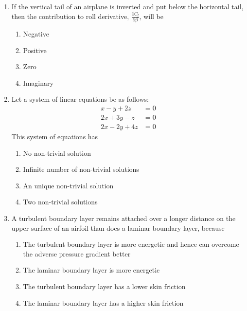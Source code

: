 \documentclass{article}
\begin{document}
\begin{enumerate}
    \item If the vertical tail of an airplane is inverted and put below the horizontal tail, then the contribution to roll derivative, $\frac{\partial C_l}{\partial \beta}$, will be
    \begin{multicols}{4}
    \begin{enumerate}
        \item Negative
        \item Positive
        \item Zero
        \item Imaginary
    \end{enumerate}
    \end{multicols}
        

    \item Let a system of linear equations be as follows:
    \[
    \begin{align}
        x - y + 2z &= 0 \\
        2x + 3y - z &= 0 \\
        2x - 2y + 4z &= 0
    \end{align}
    \]
    This system of equations has
    \begin{enumerate}
        \item No non-trivial solution
        \item Infinite number of non-trivial solutions
        \item An unique non-trivial solution
        \item Two non-trivial solutions
    \end{enumerate}
        

    \item A turbulent boundary layer remains attached over a longer distance on the upper surface of an airfoil than does a laminar boundary layer, because
    \begin{enumerate}
        \item The turbulent boundary layer is more energetic and hence can overcome the adverse pressure gradient better
        \item The laminar boundary layer is more energetic
        \item The turbulent boundary layer has a lower skin friction
        \item The laminar boundary layer has a higher skin friction
    \end{enumerate}
        


\end{enumerate}
\end{document}
